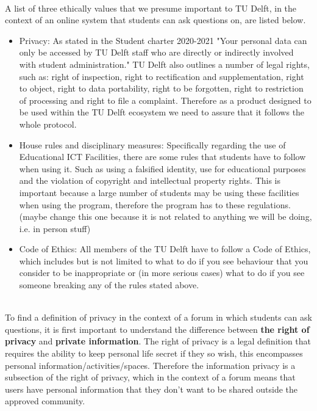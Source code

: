 \documentclass{article}
\begin{document}
\\A list of three ethically values that we presume important to TU Delft, in the context of an online system that students can ask questions on, are listed below. 
\begin{itemize}
    \item Privacy:  As stated in the Student charter 2020-2021 "Your personal data can only be accessed by TU Delft staff who are directly or indirectly involved with student administration."\citep{TUDelftMan} TU Delft also outlines a number of legal rights, such as: right of inspection, right to rectification and supplementation, right to object, right to data portability, right to be forgotten, right to restriction of processing and right to file a complaint. Therefore as a product designed to be used within the TU Delft ecosystem we need to assure that it follows the whole protocol.
    \item House rules and disciplinary measures: Specifically regarding the use of Educational ICT Facilities, there are some rules that students have to follow when using it. Such as using a falsified identity, use for educational purposes and  the violation of copyright and intellectual property rights. This is important because a large number of students may be using these facilities when using the program, therefore the program has to these regulations.  \citep{TUDelftICT} (maybe change this one because it is not related to anything we will be doing, i.e. in person stuff) 
    \item Code of Ethics: All members of the TU Delft have to follow a Code of Ethics, which includes but is not limited to what to do if you see behaviour that you consider to be inappropriate or (in more serious cases) what to do if you see someone breaking any of the rules stated above. \citep{TUDelftMan}
\end{itemize}

\\ To find a definition of privacy in the context of a forum in which students can ask questions, it is first important to understand the difference between \textbf{the right of privacy} and \textbf{private information}. The right of privacy is a legal definition that requires the ability to keep personal life secret if they so wish, this encompasses  personal information/activities/spaces. Therefore the information privacy is a subsection of the right of privacy, which in the context of a forum means that users have personal information that they don't want to be shared outside the approved community. \citep{PrivacyComputing}\\
\end{document}
